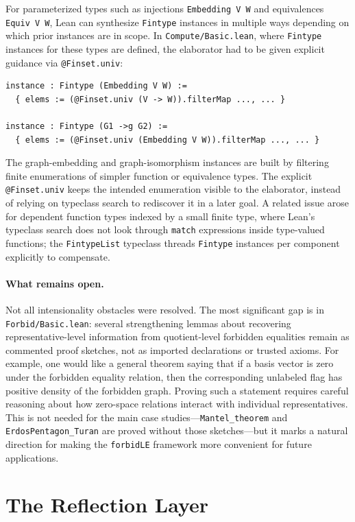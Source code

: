\documentclass{article}
\newcommand{\lean}[1]{\texttt{#1}}
\begin{document}
For parameterized types such as injections \lean{Embedding V W} and
equivalences \lean{Equiv V W}, Lean can synthesize \lean{Fintype} instances in
multiple ways depending on which prior instances are in scope.  In
\lean{Compute/Basic.lean}, where \lean{Fintype} instances for these types are
defined, the elaborator had to be given explicit guidance via
\lean{@Finset.univ}:
\begin{lstlisting}
instance : Fintype (Embedding V W) :=
  { elems := (@Finset.univ (V -> W)).filterMap ..., ... }

instance : Fintype (G1 ->g G2) :=
  { elems := (@Finset.univ (Embedding V W)).filterMap ..., ... }
\end{lstlisting}
The graph-embedding and graph-isomorphism instances are built by filtering
finite enumerations of simpler function or equivalence types.  The explicit
\lean{@Finset.univ} keeps the intended enumeration visible to the elaborator,
instead of relying on typeclass search to rediscover it in a later goal.
A related issue arose for dependent function types indexed by a small finite
type, where Lean's typeclass search does not look through \lean{match}
expressions inside type-valued functions; the \lean{FintypeList} typeclass
threads \lean{Fintype} instances per component explicitly to compensate.

\paragraph{What remains open.}
Not all intensionality obstacles were resolved.  The most significant gap is
in \lean{Forbid/Basic.lean}: several strengthening lemmas about recovering
representative-level information from quotient-level forbidden equalities
remain as commented proof sketches, not as imported declarations or trusted
axioms.  For example, one would like a general theorem saying that if a
basis vector is zero under the forbidden equality relation, then the
corresponding unlabeled flag has positive density of the forbidden graph.
Proving such a statement requires careful reasoning about how zero-space
relations interact with individual representatives.  This is not needed for
the main case studies---\lean{Mantel\_theorem} and \lean{ErdosPentagon\_Turan}
are proved without those sketches---but it marks a natural direction for
making the \lean{forbidLE} framework more convenient for future applications.



\section{The Reflection Layer}
\label{sec:reflection}
\end{document}
